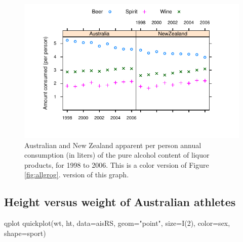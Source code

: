 \documentclass{tufte-book}\usepackage[]{graphicx}\usepackage[]{color}
\begin{document}
\begin{figure}
\includegraphics[trim=9 18 0 15]{colorArt/allgrog}%
  \caption{Australian and New Zealand apparent per person annual
  consumption (in liters) of the pure alcohol content of liquor products, for
  1998 to 2006.  This is a color version of Figure \ref{fig:allgrog}.
version of this graph.
\protect{}
\label{col:fig31}}
\vspace*{18pt}
\end{figure}

\subsection*{Height versus weight of Australian athletes}
\begin{SaveVerbatim}{qplot}
quickplot(wt, ht, data=aisRS,
     geom="point", size=I(2),
     color=sex, shape=sport)
\end{SaveVerbatim}
\end{document}
